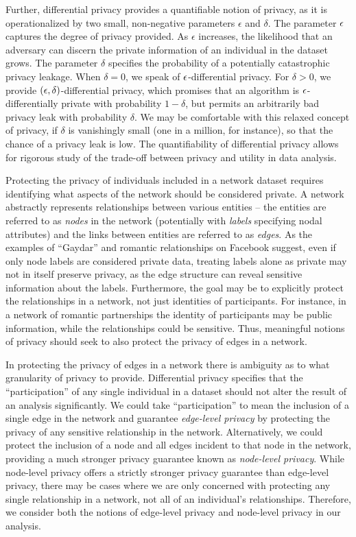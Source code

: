 Further, differential privacy provides a quantifiable notion of privacy, as it is operationalized by two small, non-negative parameters $\epsilon$ and $\delta$. The parameter $\epsilon$ captures the degree of privacy provided. As $\epsilon$ increases, the likelihood that an adversary can discern the private information of an individual in the dataset grows. The parameter $\delta$ specifies the probability of a potentially catastrophic privacy leakage. When $\delta = 0$, we speak of $\epsilon$-differential privacy. For $\delta > 0$, we provide $(\epsilon, \delta)$-differential privacy, which promises that an algorithm is $\epsilon$-differentially private with probability $1-\delta$, but permits an arbitrarily bad privacy leak with probability $\delta$. We may be comfortable with this relaxed concept of privacy, if $\delta$ is vanishingly small (one in a million, for instance), so that the chance of a privacy leak is low. The quantifiability of differential privacy allows for rigorous study of the trade-off between privacy and utility in data analysis.

Protecting the privacy of individuals included in a network dataset requires identifying what aspects of the network should be considered private. A network abstractly represents relationships between various entities -- the entities are referred to as \emph{nodes} in the network (potentially with \emph{labels} specifying nodal attributes) and the links between entities are referred to as \emph{edges}. As the examples of ``Gaydar'' and romantic relationships on Facebook suggest, even if only node labels are considered private data, treating labels alone as private may not in itself preserve privacy, as the edge structure can reveal sensitive information about the labels. Furthermore, the goal may be to explicitly protect the relationships in a network, not just identities of participants. For instance, in a network of romantic partnerships the identity of participants may be public information, while the relationships could be sensitive. Thus, meaningful notions of privacy should seek to also protect the privacy of edges in a network.

In protecting the privacy of edges in a network there is ambiguity as to what granularity of privacy to provide. Differential privacy specifies that the ``participation'' of any single individual in a dataset should not alter the result of an analysis significantly. We could take ``participation'' to mean the inclusion of a single edge in the network and guarantee \emph{edge-level privacy} by protecting the privacy of any sensitive relationship in the network. Alternatively, we could protect the inclusion of a node and all edges incident to that node in the network, providing a much stronger privacy guarantee known as \emph{node-level privacy}. While node-level privacy offers a strictly stronger privacy guarantee than edge-level privacy, there may be cases where we are only concerned with protecting any single relationship in a network, not all of an individual's relationships. Therefore, we consider both the notions of edge-level privacy and node-level privacy in our analysis.

